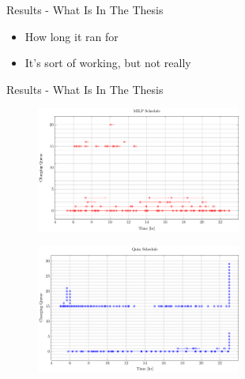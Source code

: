 \documentclass[bigger]{beamer}
\begin{document}
\begin{frame}[label={sec:org7fa2033}]{Results - What Is In The Thesis}
\begin{itemize}
\item How long it ran for
\item It's sort of working, but not really
\end{itemize}
\end{frame}
\begin{frame}[label={sec:org0074f2f}]{Results - What Is In The Thesis}
\begin{figure}[htpb]
\centering
    \includegraphics[width=0.6\textwidth]{img/sa-pap-paper/schedule-milp}
\end{figure}
\begin{figure}[htpb]
\centering
    \includegraphics[width=0.6\textwidth]{img/sa-pap-paper/schedule-quinn}
\end{figure}
\end{frame}
\end{document}
